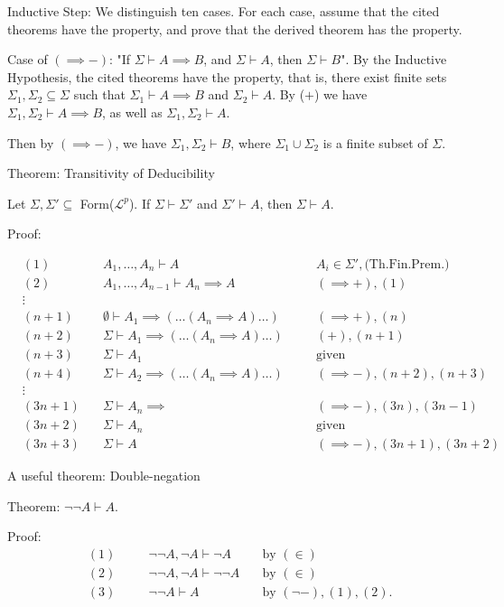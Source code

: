 \documentclass{article}
\begin{document}
Inductive Step: We distinguish ten cases. For each case, assume that the cited theorems have the property, and prove that the derived theorem has the property. 

Case of $(\implies -)$: "If $\Sigma \vdash A \implies B$, and $\Sigma \vdash A$, then $\Sigma \vdash B$". By the Inductive Hypothesis, the cited theorems have the property, that is, there exist finite sets $\Sigma_1, \Sigma_2 \subseteq \Sigma$ such that $\Sigma_1 \vdash A \implies B$ and $\Sigma_2 \vdash A$. By ($+$) we have $\Sigma_1, \Sigma_2 \vdash A \implies B$, as well as $\Sigma_1, \Sigma_2 \vdash A$. 

Then by $(\implies -)$, we have $\Sigma_1, \Sigma_2 \vdash B$, where $\Sigma_1 \cup \Sigma_2$ is a finite subset of $\Sigma$. 

Theorem: Transitivity of Deducibility

Let $\Sigma, \Sigma' \subseteq$ Form($\mathcal{L}^p$). If $\Sigma \vdash \Sigma'$ and $\Sigma' \vdash A$, then $\Sigma \vdash A$. 

Proof:

\begin{align*}
&(1) \quad &A_1, \ldots, A_n \vdash A \quad &&A_i \in \Sigma', \text{(Th.Fin.Prem.)} \\
&(2) \quad &A_1, \ldots, A_{n-1} \vdash A_n \implies A \quad &&(\implies +),(1) \\
&\vdots \\
&(n+1) \quad &\emptyset \vdash A_1 \implies (\ldots(A_n \implies A)\ldots) \quad &&(\implies +),(n) \\
&(n+2) \quad &\Sigma \vdash A_1 \implies (\ldots (A_n \implies A)\ldots) \quad &&(+),(n+1) \\
&(n+3) \quad &\Sigma \vdash A_1 \quad &&\text{given} \\
&(n+4) \quad &\Sigma \vdash A_2 \implies (\ldots (A_n \implies A) \ldots) \quad &&(\implies -), (n+2),(n+3) \\
&\vdots \\
&(3n+1) \quad &\Sigma \vdash A_n \implies \quad &&(\implies -), (3n), (3n-1) \\
&(3n+2) \quad &\Sigma \vdash A_n \quad &&\text{given} \\
&(3n+3) \quad &\Sigma \vdash A \quad &&(\implies -), (3n+1),(3n+2)
\end{align*}

A useful theorem: Double-negation

Theorem: $\neg \neg A \vdash A$.

Proof:
\begin{align*}
&(1) \quad &&\neg \neg A, \neg A \vdash \neg A \quad &\text{by } (\in) \\
&(2) \quad &&\neg \neg A, \neg A \vdash \neg \neg A \quad &\text{by } (\in) \\
&(3) \quad &&\neg \neg A \vdash A \quad &\text{by } (\neg -),(1),(2). \\
\end{align*}
\end{document}
